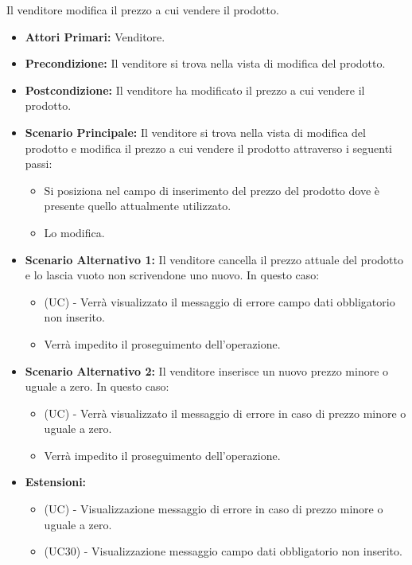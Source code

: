 Il venditore modifica il prezzo a cui vendere il prodotto.
\begin{itemize}
    \item \textbf{Attori Primari:} Venditore.
    \item \textbf{Precondizione:} Il venditore si trova nella vista di modifica del prodotto.
    \item \textbf{Postcondizione:} Il venditore ha modificato il prezzo a cui vendere il prodotto.
    \item \textbf{Scenario Principale:} Il venditore si trova nella vista di modifica del prodotto e modifica il prezzo a cui vendere il prodotto attraverso i seguenti passi:
    \begin{itemize}
        \item Si posiziona nel campo di inserimento del prezzo del prodotto dove è presente quello attualmente utilizzato.
        \item Lo modifica.
    \end{itemize}
    \item \textbf{Scenario Alternativo 1:} Il venditore cancella il prezzo attuale del prodotto e lo lascia vuoto non scrivendone uno nuovo. In questo caso:
    \begin{itemize}
        \item (UC) - Verrà visualizzato il messaggio di errore campo dati obbligatorio non inserito.
        \item Verrà impedito il proseguimento dell'operazione.
    \end{itemize}
    \item \textbf{Scenario Alternativo 2:} Il venditore inserisce un nuovo prezzo minore o uguale a zero. In questo caso:
    \begin{itemize}
        \item (UC) - Verrà visualizzato il messaggio di errore in caso di prezzo minore o uguale a zero.
        \item Verrà impedito il proseguimento dell'operazione.
    \end{itemize}
    \item \textbf{Estensioni:}
        \begin{itemize}
            \item (UC) - Visualizzazione messaggio di errore in caso di prezzo minore o uguale a zero.
            \item (UC30) - Visualizzazione messaggio campo dati obbligatorio non inserito.
        \end{itemize}
\end{itemize}

